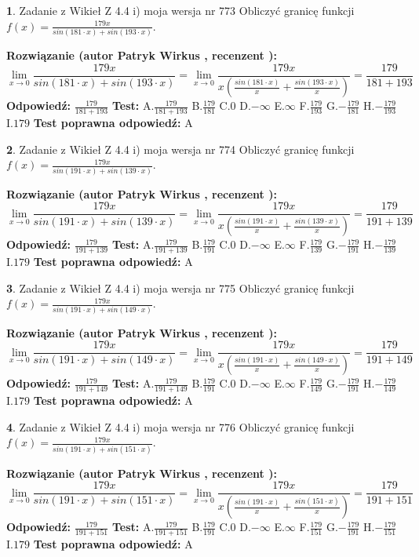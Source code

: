 \documentclass[12pt, a4paper]{article}
\theoremstyle{definition} %
\newtheorem{zad}{}
\newcommand{\zadStart}[1]{\begin{zad}#1\newline}
\newcommand{\zadStop}{\end{zad}}
\newcommand{\rozwStart}[2]{\noindent \textbf{Rozwiązanie (autor #1 , recenzent #2): }\newline}
\newcommand{\rozwStop}{\newline}
\newcommand{\odpStart}{\noindent \textbf{Odpowiedź:}\newline}
\newcommand{\odpStop}{\newline}
\newcommand{\testStart}{\noindent \textbf{Test:}\newline}
\newcommand{\testStop}{\newline}
\newcommand{\kluczStart}{\noindent \textbf{Test poprawna odpowiedź:}\newline}
\newcommand{\kluczStop}{\newline}
\begin{document}
\zadStart{Zadanie z Wikieł Z 4.4 i) moja wersja nr 773}
Obliczyć granicę funkcji $f(x)=\frac{179x}{sin(181\cdot x) +sin(193\cdot x)}$.
\zadStop
\rozwStart{Patryk Wirkus}{}
$$\lim\limits_{x\to 0}\frac{179x}{sin(181\cdot x) +sin(193\cdot x)}=\lim\limits_{x\to 0}\frac{179x}{x(\frac{sin(181\cdot x)}{x}+\frac{sin(193\cdot x)}{x})}=\frac{179}{181+193}$$
\rozwStop
\odpStart
$\frac{179}{181+193}$
\odpStop
\testStart
A.$\frac{179}{181+193}$
B.$\frac{179}{181}$
C.$0$
D.$-\infty$
E.$\infty$
F.$\frac{179}{193}$
G.$-\frac{179}{181}$
H.$-\frac{179}{193}$
I.$179$
\testStop
\kluczStart
A
\kluczStop



\zadStart{Zadanie z Wikieł Z 4.4 i) moja wersja nr 774}
Obliczyć granicę funkcji $f(x)=\frac{179x}{sin(191\cdot x) +sin(139\cdot x)}$.
\zadStop
\rozwStart{Patryk Wirkus}{}
$$\lim\limits_{x\to 0}\frac{179x}{sin(191\cdot x) +sin(139\cdot x)}=\lim\limits_{x\to 0}\frac{179x}{x(\frac{sin(191\cdot x)}{x}+\frac{sin(139\cdot x)}{x})}=\frac{179}{191+139}$$
\rozwStop
\odpStart
$\frac{179}{191+139}$
\odpStop
\testStart
A.$\frac{179}{191+139}$
B.$\frac{179}{191}$
C.$0$
D.$-\infty$
E.$\infty$
F.$\frac{179}{139}$
G.$-\frac{179}{191}$
H.$-\frac{179}{139}$
I.$179$
\testStop
\kluczStart
A
\kluczStop



\zadStart{Zadanie z Wikieł Z 4.4 i) moja wersja nr 775}
Obliczyć granicę funkcji $f(x)=\frac{179x}{sin(191\cdot x) +sin(149\cdot x)}$.
\zadStop
\rozwStart{Patryk Wirkus}{}
$$\lim\limits_{x\to 0}\frac{179x}{sin(191\cdot x) +sin(149\cdot x)}=\lim\limits_{x\to 0}\frac{179x}{x(\frac{sin(191\cdot x)}{x}+\frac{sin(149\cdot x)}{x})}=\frac{179}{191+149}$$
\rozwStop
\odpStart
$\frac{179}{191+149}$
\odpStop
\testStart
A.$\frac{179}{191+149}$
B.$\frac{179}{191}$
C.$0$
D.$-\infty$
E.$\infty$
F.$\frac{179}{149}$
G.$-\frac{179}{191}$
H.$-\frac{179}{149}$
I.$179$
\testStop
\kluczStart
A
\kluczStop



\zadStart{Zadanie z Wikieł Z 4.4 i) moja wersja nr 776}
Obliczyć granicę funkcji $f(x)=\frac{179x}{sin(191\cdot x) +sin(151\cdot x)}$.
\zadStop
\rozwStart{Patryk Wirkus}{}
$$\lim\limits_{x\to 0}\frac{179x}{sin(191\cdot x) +sin(151\cdot x)}=\lim\limits_{x\to 0}\frac{179x}{x(\frac{sin(191\cdot x)}{x}+\frac{sin(151\cdot x)}{x})}=\frac{179}{191+151}$$
\rozwStop
\odpStart
$\frac{179}{191+151}$
\odpStop
\testStart
A.$\frac{179}{191+151}$
B.$\frac{179}{191}$
C.$0$
D.$-\infty$
E.$\infty$
F.$\frac{179}{151}$
G.$-\frac{179}{191}$
H.$-\frac{179}{151}$
I.$179$
\testStop
\kluczStart
A
\kluczStop
\end{document}
